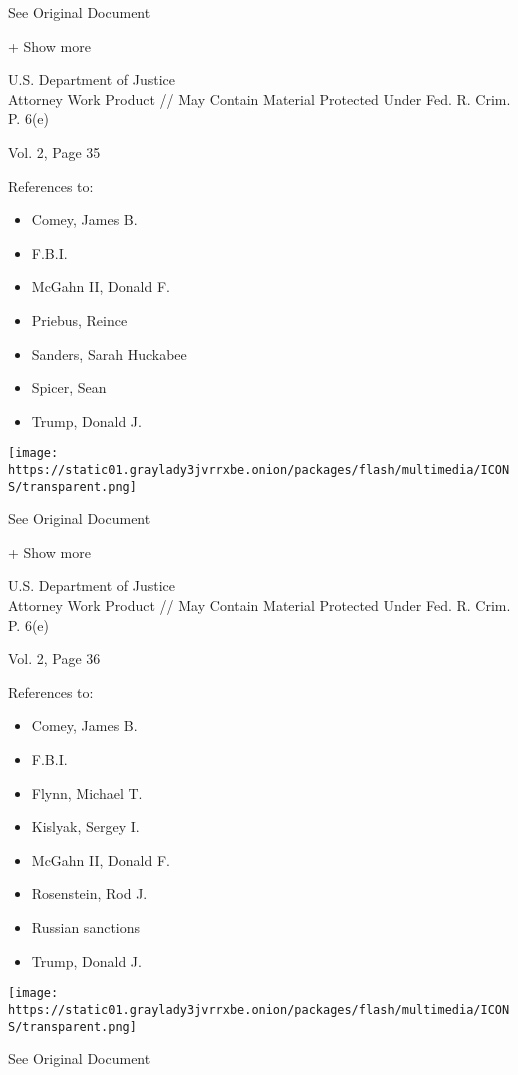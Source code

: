 See Original Document

+ Show more

U.S. Department of Justice\\
Attorney Work Product // May Contain Material Protected Under Fed. R.
Crim. P. 6(e)

Vol. 2, Page 35

References to:

\begin{itemize}
\tightlist
\item
  Comey, James B.
\item
  F.B.I.
\item
  McGahn II, Donald F.
\item
  Priebus, Reince
\item
  Sanders, Sarah Huckabee
\item
  Spicer, Sean
\item
  Trump, Donald J.
\end{itemize}

\protect\hyperlink{}{}

\texttt{[image: https://static01.graylady3jvrrxbe.onion/packages/flash/multimedia/ICONS/transparent.png]}

See Original Document

+ Show more

U.S. Department of Justice\\
Attorney Work Product // May Contain Material Protected Under Fed. R.
Crim. P. 6(e)

Vol. 2, Page 36

References to:

\begin{itemize}
\tightlist
\item
  Comey, James B.
\item
  F.B.I.
\item
  Flynn, Michael T.
\item
  Kislyak, Sergey I.
\item
  McGahn II, Donald F.
\item
  Rosenstein, Rod J.
\item
  Russian sanctions
\item
  Trump, Donald J.
\end{itemize}

\protect\hyperlink{}{}

\texttt{[image: https://static01.graylady3jvrrxbe.onion/packages/flash/multimedia/ICONS/transparent.png]}

See Original Document

